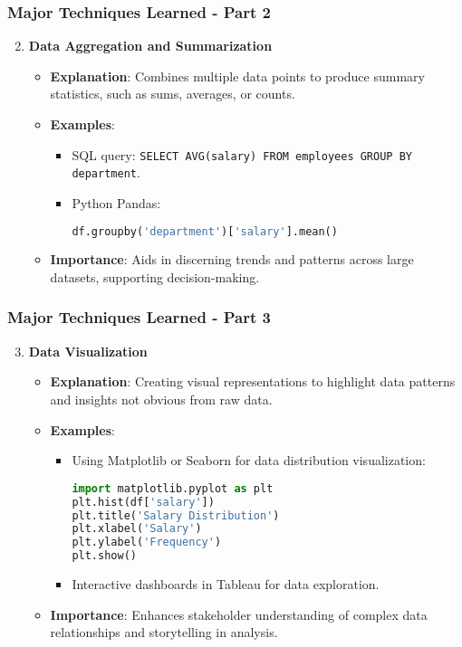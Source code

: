 \documentclass[aspectratio=169]{beamer}
\begin{document}
\begin{frame}[fragile]
    \frametitle{Major Techniques Learned - Part 2}
    \begin{enumerate}
        \setcounter{enumi}{1}
        \item \textbf{Data Aggregation and Summarization}
        \begin{itemize}
            \item \textbf{Explanation}: Combines multiple data points to produce summary statistics, such as sums, averages, or counts.
            \item \textbf{Examples}:
                \begin{itemize}
                    \item SQL query: \texttt{SELECT AVG(salary) FROM employees GROUP BY department}.
                    \item Python Pandas: 
                    \begin{lstlisting}[language=Python]
df.groupby('department')['salary'].mean()
                    \end{lstlisting}
                \end{itemize}
            \item \textbf{Importance}: Aids in discerning trends and patterns across large datasets, supporting decision-making.
        \end{itemize}
    \end{enumerate}
\end{frame}

\begin{frame}[fragile]
    \frametitle{Major Techniques Learned - Part 3}
    \begin{enumerate}
        \setcounter{enumi}{2}
        \item \textbf{Data Visualization}
        \begin{itemize}
            \item \textbf{Explanation}: Creating visual representations to highlight data patterns and insights not obvious from raw data.
            \item \textbf{Examples}:
                \begin{itemize}
                    \item Using Matplotlib or Seaborn for data distribution visualization:
                    \begin{lstlisting}[language=Python]
import matplotlib.pyplot as plt
plt.hist(df['salary'])
plt.title('Salary Distribution')
plt.xlabel('Salary')
plt.ylabel('Frequency')
plt.show()
                    \end{lstlisting}
                    \item Interactive dashboards in Tableau for data exploration.
                \end{itemize}
            \item \textbf{Importance}: Enhances stakeholder understanding of complex data relationships and storytelling in analysis.
        \end{itemize}
    \end{enumerate}
\end{frame}
\end{document}
